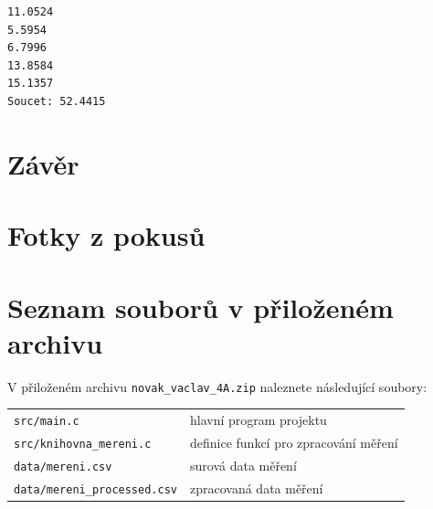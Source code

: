 \documentclass[12pt]{report}
\begin{document}
\lipsum[1]

\begin{lstlisting}[numbers=none, title={Příklad výstupního souboru}]
11.0524
5.5954
6.7996
13.8584
15.1357
Soucet: 52.4415
\end{lstlisting}

\chapter*{Závěr}
	
\lipsum[1]
	
\printbibliography					%
\printglossary[title={Zkratky}]		%
\listoffigures						%
\listoftables						%

\begin{appendices}
	\chapter{Fotky z pokusů}	
	\lipsum[1]
	\chapter{Seznam souborů v přiloženém archivu}
	V přiloženém archivu \texttt{novak\_vaclav\_4A.zip} naleznete následující soubory:

	\begin{center}
	\begin{tabular}{@{}l@{\,\dotfill\;}l@{}}
		\texttt{src/main.c}                    & hlavní program projektu \\
		\texttt{src/knihovna\_mereni.c}         & definice funkcí pro zpracování měření \\
		\texttt{data/mereni.csv}                & surová data měření \\
		\texttt{data/mereni\_processed.csv}     & zpracovaná data měření \\
	\end{tabular}
	\end{center}
\end{appendices}
\end{document}

